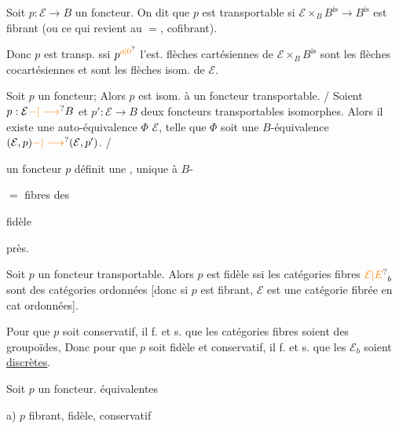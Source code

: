 Soit \(p:\mathcal E\longrightarrow B\) un foncteur. On dit que \(p\) est transportable si  \(\mathcal E\times_B B^{\mathrm{is}}\longrightarrow B^{\mathrm{is}}\) est fibrant (ou ce qui revient au \(=\), cofibrant).

Donc \(p\) est  transp. ssi \(p^{\unsure{o|0}}\) l'est.  flèches cartésiennes de \(\mathcal E\times_B B^{\mathrm{is}}\) sont les flèches cocartésiennes et sont les flèches isom. de \(\mathcal E\).

Soit \(p\) un foncteur; Alors \(p\) est isom. à un foncteur transportable. / Soient \(p:\mathcal E\unsure{-|\longrightarrow}B\) et \(p':\mathcal E\longrightarrow B\) deux foncteurs transportables isomorphes. Alors il existe une auto-équivalence \(\Phi\)  \(\mathcal E\),  telle que \(\Phi\) soit une \(B\)-équivalence \((\mathcal E,p)\unsure{-|\longrightarrow}(\mathcal E,p')\). /

 un foncteur \(p\) définit une  ,     unique à \(B\)-

 \(=\) fibres des 

fidèle

 près.

Soit \(p\) un foncteur transportable. Alors \(p\) est fidèle ssi les catégories fibres \(\unsure{\mathcal E|E}_b\) sont des catégories ordonnées [donc si \(p\) est fibrant, \(\mathcal E\) est une catégorie fibrée en cat ordonnées].

Pour que \(p\) soit conservatif, il f. et s. que les catégories fibres soient des groupoïdes, \deleted{[ou encore que tout morphisme de \(\mathcal E\times_{\unsure{B|\mathcal B}} B^{\mathrm{is}}\) soit cartésien,} Donc pour que \(p\) soit fidèle et conservatif, il f. et s. que les \(\mathcal E_b\) soient \uline{discrètes}.

Soit \(p\) un foncteur.   équivalentes

a) \(p\) fibrant, fidèle, conservatif

